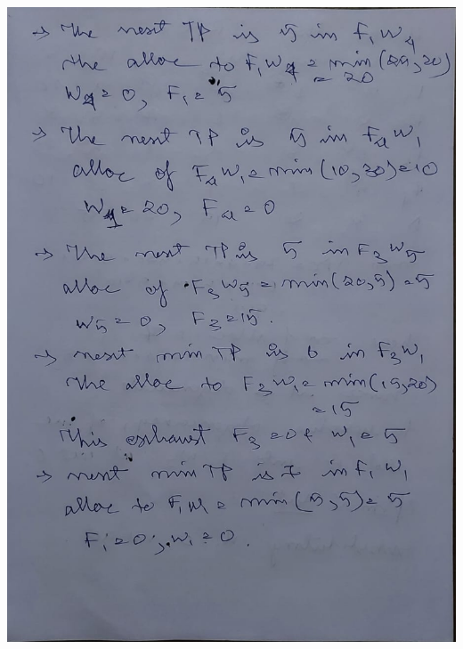 \documentclass[12pt, letterpaper, twoside]{book}
\begin{document}
\includegraphics[width=\paperwidth, height=\paperheight]{Page21}
\end{document}
